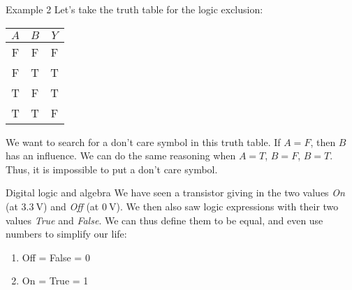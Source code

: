 \documentclass[a4paper]{article}
\begin{document}
\begin{parag}{Example 2}
    Let's take the truth table for the logic exclusion:
    \begin{center}
        \begin{tabular}{c|c|c}
            $A$ & $B$ & $Y$ \\
            \hline
            F & F & F \\
            F & T & T \\
            T & F & T \\
            T & T & F \\
        \end{tabular}
    \end{center}
    
    We want to search for a don't care symbol in this truth table. If $A = F$, then $B$ has an influence. We can do the same reasoning when $A = T$, $B = F$, $B = T$. Thus, it is impossible to put a don't care symbol.
\end{parag}

\begin{parag}{Digital logic and algebra}
    We have seen a transistor giving in the two values \textit{On} (at $\SI{3.3}{\volt }$) and \textit{Off} (at $\SI{0}{\volt }$). We then also saw logic expressions with their two values \textit{True} and \textit{False}. We can thus define them to be equal, and even use numbers to simplify our life:
    \begin{enumerate}
        \item Off = False = 0
        \item On = True = 1
    \end{enumerate}
\end{parag}
\end{document}
